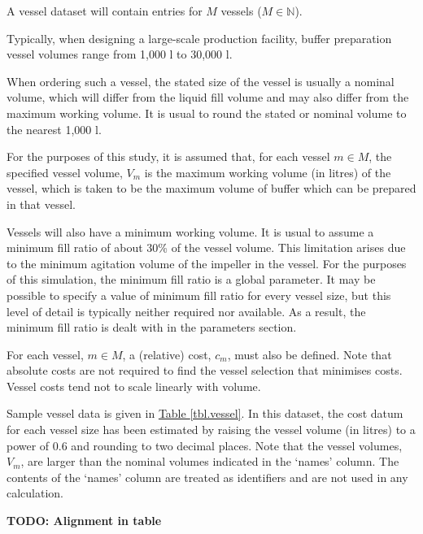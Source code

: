 A vessel dataset will contain entries for $M$ vessels ($M \in \mathbb{N}$).

Typically, when designing a large-scale production facility, buffer preparation
vessel volumes range from 1,000 l to 30,000 l.

When ordering such a vessel, the stated size of the vessel is usually a nominal
volume, which will differ from the liquid fill volume and may also differ from
the maximum working volume.
It is usual to round the stated or nominal volume to the nearest 1,000 l.

For the purposes of this study, it is assumed that, for each vessel $m \in M$,
the specified vessel volume, $V_{m}$ is the maximum working volume (in litres)
of the vessel, which is taken to be the maximum volume of buffer which can be
prepared in that vessel.

Vessels will also have a minimum working volume. 
It is usual to assume a minimum fill ratio of about 30\% of the vessel volume. 
This limitation arises due to the minimum agitation volume of the impeller in
the vessel. 
For the purposes of this simulation, the minimum fill ratio is a global
parameter.
It may be possible to specify a value of minimum fill ratio for every vessel
size, but this level of detail is typically neither required nor available.
As a result, the minimum fill ratio is dealt with in the parameters section.

For each vessel, $m \in M$, a (relative) cost, $c_{m}$, must also be defined.
Note that absolute costs are not required to find the vessel selection that
minimises costs.
Vessel costs tend not to scale linearly with volume.

Sample vessel data is given in \hyperref[tbl.vessel]{Table \ref*{tbl.vessel}}.
In this dataset, the cost datum for each vessel size has been estimated by
raising the vessel volume (in litres) to a power of 0.6 and rounding to two
decimal places.
Note that the vessel volumes, $V_{m}$, are larger than the nominal volumes
indicated in the `names' column.  The contents of the `names' column are
treated as identifiers and are not used in any calculation.

\textbf{TODO: Alignment in table}


